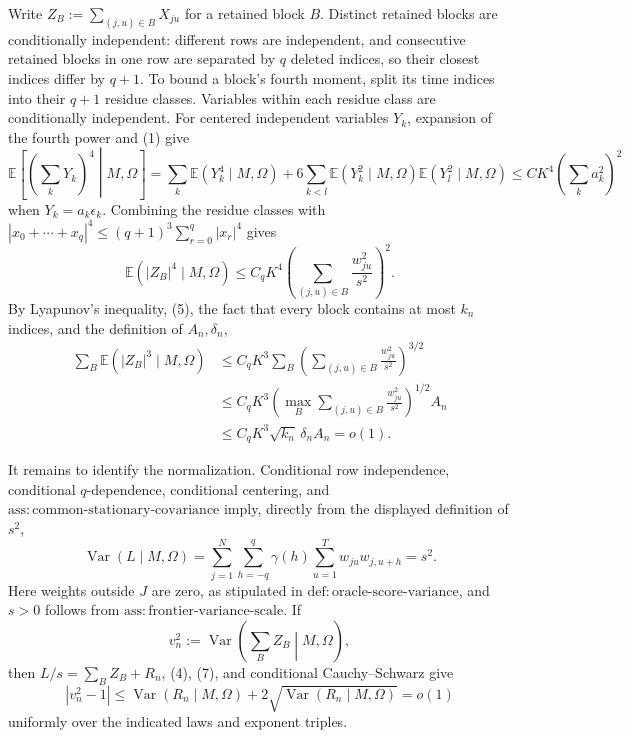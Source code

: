 Write \(Z_B:=\sum_{(j,u)\in B}X_{ju}\) for a retained block \(B\).  Distinct retained blocks are conditionally independent: different rows are independent, and consecutive retained blocks in one row are separated by \(q\) deleted indices, so their closest indices differ by \(q+1\).  To bound a block's fourth moment, split its time indices into their \(q+1\) residue classes.  Variables within each residue class are conditionally independent.  For centered independent variables \(Y_k\), expansion of the fourth power and (1) give
\[
 \mathbb E\!\left[\left(\sum_kY_k\right)^4\middle|M,\Omega\right]
 =\sum_k\mathbb E(Y_k^4\mid M,\Omega)
  +6\sum_{k<l}\mathbb E(Y_k^2\mid M,\Omega)
                    \mathbb E(Y_l^2\mid M,\Omega)
 \le C K^4\left(\sum_k a_k^2\right)^2
\]
when \(Y_k=a_k\epsilon_k\).  Combining the residue classes with
\( |x_0+\cdots+x_q|^4\le(q+1)^3\sum_{r=0}^q|x_r|^4 \) gives
\[
 \mathbb E(|Z_B|^4\mid M,\Omega)
 \le C_qK^4\left(\sum_{(j,u)\in B}\frac{w_{ju}^2}{s^2}\right)^2.
\tag{5}
\]
By Lyapunov's inequality, (5), the fact that every block contains at most \(k_n\) indices, and the definition of \(A_n,\delta_n\),
\[
 \begin{aligned}
 \sum_B\mathbb E(|Z_B|^3\mid M,\Omega)
 &\le C_qK^3
   \sum_B\left(\sum_{(j,u)\in B}\frac{w_{ju}^2}{s^2}\right)^{3/2}\\
 &\le C_qK^3
   \left(\max_B\sum_{(j,u)\in B}\frac{w_{ju}^2}{s^2}\right)^{1/2}A_n\\
 &\le C_qK^3\sqrt{k_n}\,\delta_n A_n=o(1).
 \end{aligned}
\tag{6}
\]

It remains to identify the normalization.  Conditional row independence, conditional \(q\)-dependence, conditional centering, and \(\mathrm{ass:common\mbox{-}stationary\mbox{-}covariance}\) imply, directly from the displayed definition of \(s^2\),
\[
 \operatorname{Var}(L\mid M,\Omega)
 =\sum_{j=1}^N\sum_{h=-q}^{q}\gamma(h)
    \sum_{u=1}^T w_{ju}w_{j,u+h}=s^2.
\tag{7}
\]
Here weights outside \(J\) are zero, as stipulated in \(\mathrm{def:oracle\mbox{-}score\mbox{-}variance}\), and \(s>0\) follows from \(\mathrm{ass:frontier\mbox{-}variance\mbox{-}scale}\).  If
\[
 v_n^2:=\operatorname{Var}\!\left(\sum_BZ_B\middle|M,\Omega\right),
\]
then \(L/s=\sum_BZ_B+R_n\), (4), (7), and conditional Cauchy--Schwarz give
\[
 |v_n^2-1|
 \le \operatorname{Var}(R_n\mid M,\Omega)
 +2\sqrt{\operatorname{Var}(R_n\mid M,\Omega)}=o(1)
\tag{8}
\]
uniformly over the indicated laws and exponent triples.

